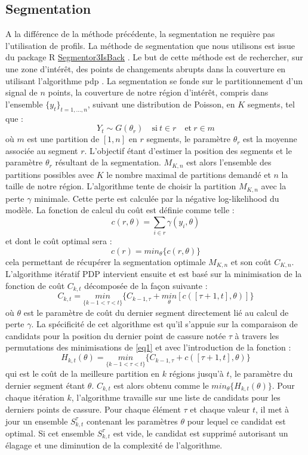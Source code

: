 \documentclass[12pt,a4paper]{report}
\begin{document}
\begin{onehalfspace}
\section*{Segmentation}
\label{methode_segmentation}
A la différence de la méthode précédente, la segmentation ne requière pas l'utilisation de profils. La méthode de segmentation que nous utilisons est issue du package R \href{http://cran.r-project.org/web/packages/Segmentor3IsBack/index.html}{Segmentor3IsBack} \citep{Cleynen2014}. Le but de cette méthode est de rechercher, sur une zone d'intérêt, des points de changements abrupts dans la couverture en utilisant l'algorithme \gls{pdp} \citep{Rigaill2010}. La segmentation se fonde sur le partitionnement d'un signal de $n$ points, la couverture de notre région d'intérêt, compris dans l'ensemble ${\{y_t\}_{t=1,\ldots,n}}$, suivant une distribution de Poisson, en $K$ segments, tel que :
\[ Y_t \sim G(\theta_r) \quad \text{si}\ t \in r \quad \text{et}\ r \in m \]
où $m$ est une partition de $[1,n]$ en $r$ segments, le paramètre $\theta_r$ est la moyenne associée au segment $r$. L'objectif étant d'estimer la position des segments et le paramètre $\theta_r$ résultant de la segmentation. $M_{K,n}$ est alors l'ensemble des partitions possibles avec $K$ le nombre maximal de partitions demandé et $n$ la taille de notre région. L'algorithme tente de choisir la partition $M_{K,n}$ avec la perte $\gamma$ minimale. Cette perte est calculée par la négative log-likelihood du modèle. La fonction de calcul du coût est définie comme telle :
\[ c(r,\theta) = \sum_{i \in r} \gamma(y_i,\theta) \]
et dont le coût optimal sera :
\[ c(r) = min_\theta\{c(r,\theta)\} \]
cela permettant de récupérer la segmentation optimale $M_{K,n}$ et son coût $C_{K,n}$. L'algorithme itératif PDP intervient ensuite et est basé sur la minimisation de la fonction de coût $C_{k,t}$ décomposée de la façon suivante :
\begin{equation}
\label{eq1}
C_{k,t} = \underset{\{k-1<\tau<t\}}{min} \{C_{k-1,\tau} + \underset{\theta}{min}[c([\tau + 1,t],\theta)]\}
\end{equation}
où $\theta$ est le paramètre de coût du dernier segment directement lié au calcul de perte $\gamma$. La spécificité de cet algorithme est qu'il s'appuie sur la comparaison de candidats pour la position du dernier point de cassure notée $\tau$ à travers les permutations des minimisations de \eqref{eq1} et avec l'introduction de la fonction :
\[ H_{k,t}(\theta) = \underset{\{k-1<\tau<t\}}{min} \{C_{k-1,\tau} + c([\tau + 1,t],\theta)\} \]
qui est le coût de la meilleure partition en $k$ régions jusqu'à $t$, le paramètre du dernier segment étant $\theta$. $C_{k,t}$ est alors obtenu comme le $min_\theta\{H_{k,t}(\theta)\}$.
Pour chaque itération $k$, l'algorithme travaille sur une liste de candidats pour les derniers points de cassure. Pour chaque élément $\tau$ et chaque valeur $t$, il met à jour un ensemble $S_{k,t}^\tau$ contenant les paramètres $\theta$ pour lequel ce candidat est optimal. Si cet ensemble $S_{k,t}^\tau$ est vide, le candidat est supprimé autorisant un élagage et une diminution de la complexité de l'algorithme.


\end{onehalfspace}
\end{document}
